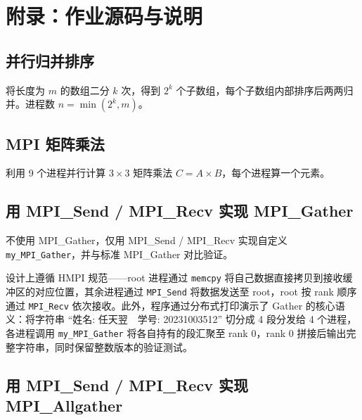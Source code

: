 \clearpage
\section{附录：作业源码与说明}


\subsection{并行归并排序}

\noindent 将长度为 $m$ 的数组二分 $k$ 次，得到 $2^k$ 个子数组，每个子数组内部排序后两两归并。进程数 $n = \min(2^k, m)$。



\clearpage
\subsection{MPI 矩阵乘法}

\noindent 利用 9 个进程并行计算 $3\times3$ 矩阵乘法 $C = A \times B$，每个进程算一个元素。



\clearpage
\subsection{用 MPI\_Send / MPI\_Recv 实现 MPI\_Gather}

\noindent 不使用 MPI\_Gather，仅用 MPI\_Send / MPI\_Recv 实现自定义 \texttt{my\_MPI\_Gather}，并与标准 MPI\_Gather 对比验证。

设计上遵循 HMPI 规范——root 进程通过 \texttt{memcpy} 将自己数据直接拷贝到接收缓冲区的对应位置，其余进程通过 \texttt{MPI\_Send} 将数据发送至 root，root 按 rank 顺序通过 \texttt{MPI\_Recv} 依次接收。此外，程序通过分布式打印演示了 Gather 的核心语义：将字符串 ``姓名: 任天翌~~学号: 20231003512'' 切分成 4 段分发给 4 个进程，各进程调用 \texttt{my\_MPI\_Gather} 将各自持有的段汇聚至 rank 0，rank 0 拼接后输出完整字符串，同时保留整数版本的验证测试。



\clearpage
\subsection{用 MPI\_Send / MPI\_Recv 实现 MPI\_Allgather}

